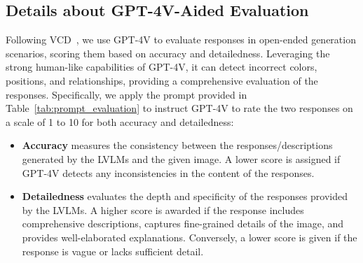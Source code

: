 \subsection{Details about GPT-4V-Aided Evaluation}
Following VCD~\citep{leng2024mitigating}, we use GPT-4V to evaluate responses in open-ended generation scenarios, scoring them based on accuracy and detailedness. Leveraging the strong human-like capabilities of GPT-4V, it can detect incorrect colors, positions, and relationships, providing a comprehensive evaluation of the responses.
Specifically, we apply the prompt provided in Table~\ref{tab:prompt_evaluation} to instruct GPT-4V to rate the two responses on a scale of 1 to 10 for both accuracy and detailedness:
\begin{itemize}
    \item \textbf{Accuracy} measures the consistency between the responses/descriptions generated by the LVLMs and the given image. A lower score is assigned if GPT-4V detects any inconsistencies in the content of the responses.
    \item \textbf{Detailedness} evaluates the depth and specificity of the responses provided by the LVLMs. A higher score is awarded if the response includes comprehensive descriptions, captures fine-grained details of the image, and provides well-elaborated explanations. Conversely, a lower score is given if the response is vague or lacks sufficient detail.
\end{itemize}


